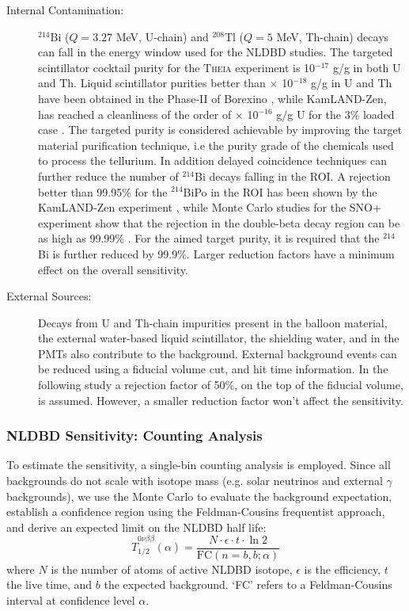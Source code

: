 \begin{description}
\item[Internal Contamination:] $^{214}$Bi ($Q=3.27$ MeV, U-chain) and $^{208}$Tl ($Q=5$ MeV, Th-chain) decays can fall in the energy window used for the NLDBD studies. The targeted scintillator cocktail purity for the \textsc{Theia} experiment is 10$^{-17}$ g/g in both U and Th. Liquid scintillator purities better than $\times$ 10$^{-18}$ g/g in U and Th have been obtained in the Phase-II of Borexino \cite{bxo16}, while KamLAND-Zen, has reached a cleanliness of the order of $\times$ 10$^{-16}$ g/g U for the 3\% loaded case \cite{gando13}. The targeted purity is considered achievable by improving the target material purification technique, i.e the purity grade of the chemicals used to process the tellurium. In addition delayed coincidence techniques can further reduce the number of $^{214}$Bi decays falling in the ROI. A rejection better than 99.95\% for the $^{214}$BiPo in the ROI has been shown by the KamLAND-Zen experiment \cite{KD-Zen}, while Monte Carlo studies for the SNO+ experiment show that the rejection in the double-beta decay region can be as high as 99.99\% \cite{snop16}. For the aimed target purity, it is required that the $^{214}$Bi is further reduced by 99.9\%. Larger reduction factors have a minimum effect on the overall sensitivity.
\item[External Sources:] Decays from U and Th-chain impurities present in the balloon material, the external water-based liquid scintillator, the
shielding water, and in the PMTs also contribute to the background. External background events can be reduced using a fiducial volume cut, and hit time information. In the following study a rejection factor of 50\%, on the top of the fiducial volume, is assumed. However, a smaller reduction factor won't affect the sensitivity.
\end{description}

\subsubsection{NLDBD Sensitivity: Counting Analysis}\label{sec::sensitivity}

To estimate the sensitivity, a single-bin counting analysis is employed. Since all backgrounds do not scale with isotope mass (e.g. solar neutrinos
and external $\gamma$ backgrounds), we use the Monte Carlo to evaluate the background expectation, establish a confidence region using the Feldman-Cousins frequentist approach, and derive an expected limit on the NLDBD half life:
\begin{equation}
\label{eq:sens}
\widehat{T}_{1/2}^{0\nu\beta\beta}(\alpha) = 
\frac{N\cdot \epsilon \cdot t \cdot \ln 2}{\mathrm{FC}(n=b, b; \alpha)}
\end{equation}
where $N$ is the number of atoms of active NLDBD isotope, $\epsilon$ is the efficiency, $t$ the live time, and $b$ the expected background.
`FC' refers to a Feldman-Cousins interval at confidence level $\alpha$.

